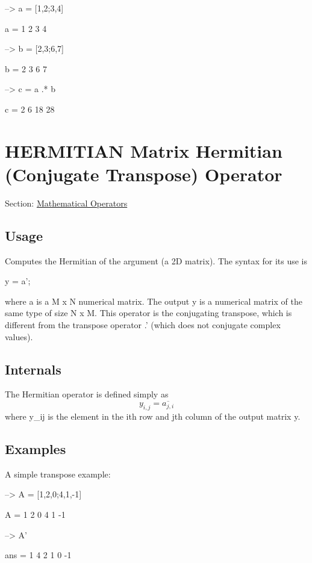 \begin{DoxyVerbInclude}
--> a = [1,2;3,4]

a = 
 1 2 
 3 4 

--> b = [2,3;6,7]

b = 
 2 3 
 6 7 

--> c = a .* b

c = 
  2  6 
 18 28 
\end{DoxyVerbInclude}
 \hypertarget{operators_hermitian}{}\section{H\-E\-R\-M\-I\-T\-I\-A\-N Matrix Hermitian (Conjugate Transpose) Operator}\label{operators_hermitian}
Section\-: \hyperlink{sec_operators}{Mathematical Operators} \hypertarget{vtkwidgets_vtkxyplotwidget_Usage}{}\subsection{Usage}\label{vtkwidgets_vtkxyplotwidget_Usage}
Computes the Hermitian of the argument (a 2\-D matrix). The syntax for its use is \begin{DoxyVerb}  y = a';
\end{DoxyVerb}
 where {\ttfamily a} is a {\ttfamily M x N} numerical matrix. The output {\ttfamily y} is a numerical matrix of the same type of size {\ttfamily N x M}. This operator is the conjugating transpose, which is different from the transpose operator {\ttfamily .'} (which does not conjugate complex values). \hypertarget{transforms_svd_Function}{}\subsection{Internals}\label{transforms_svd_Function}
The Hermitian operator is defined simply as \[ y_{i,j} = \overline{a_{j,i}} \] where {\ttfamily y\-\_\-ij} is the element in the {\ttfamily i}th row and {\ttfamily j}th column of the output matrix {\ttfamily y}. \hypertarget{variables_matrix_Examples}{}\subsection{Examples}\label{variables_matrix_Examples}
A simple transpose example\-:


\begin{DoxyVerbInclude}
--> A = [1,2,0;4,1,-1]

A = 
  1  2  0 
  4  1 -1 

--> A'

ans = 
  1  4 
  2  1 
  0 -1 
\end{DoxyVerbInclude}


